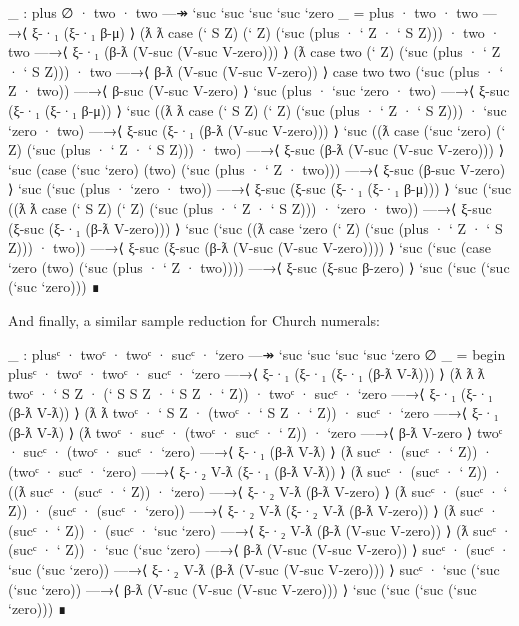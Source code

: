 \begin{fence}
\begin{code}
_ : plus {∅} · two · two —↠ `suc `suc `suc `suc `zero
_ =
    plus · two · two
  —→⟨ ξ-·₁ (ξ-·₁ β-μ) ⟩
    (ƛ ƛ case (` S Z) (` Z) (`suc (plus · ` Z · ` S Z))) · two · two
  —→⟨ ξ-·₁ (β-ƛ (V-suc (V-suc V-zero))) ⟩
    (ƛ case two (` Z) (`suc (plus · ` Z · ` S Z))) · two
  —→⟨ β-ƛ (V-suc (V-suc V-zero)) ⟩
    case two two (`suc (plus · ` Z · two))
  —→⟨ β-suc (V-suc V-zero) ⟩
    `suc (plus · `suc `zero · two)
  —→⟨ ξ-suc (ξ-·₁ (ξ-·₁ β-μ)) ⟩
    `suc ((ƛ ƛ case (` S Z) (` Z) (`suc (plus · ` Z · ` S Z)))
      · `suc `zero · two)
  —→⟨ ξ-suc (ξ-·₁ (β-ƛ (V-suc V-zero))) ⟩
    `suc ((ƛ case (`suc `zero) (` Z) (`suc (plus · ` Z · ` S Z))) · two)
  —→⟨ ξ-suc (β-ƛ (V-suc (V-suc V-zero))) ⟩
    `suc (case (`suc `zero) (two) (`suc (plus · ` Z · two)))
  —→⟨ ξ-suc (β-suc V-zero) ⟩
    `suc (`suc (plus · `zero · two))
  —→⟨ ξ-suc (ξ-suc (ξ-·₁ (ξ-·₁ β-μ))) ⟩
    `suc (`suc ((ƛ ƛ case (` S Z) (` Z) (`suc (plus · ` Z · ` S Z)))
      · `zero · two))
  —→⟨ ξ-suc (ξ-suc (ξ-·₁ (β-ƛ V-zero))) ⟩
    `suc (`suc ((ƛ case `zero (` Z) (`suc (plus · ` Z · ` S Z))) · two))
  —→⟨ ξ-suc (ξ-suc (β-ƛ (V-suc (V-suc V-zero)))) ⟩
    `suc (`suc (case `zero (two) (`suc (plus · ` Z · two))))
  —→⟨ ξ-suc (ξ-suc β-zero) ⟩
   `suc (`suc (`suc (`suc `zero)))
  ∎
\end{code}
\end{fence}

And finally, a similar sample reduction for Church numerals:

\begin{fence}
\begin{code}
_ : plusᶜ · twoᶜ · twoᶜ · sucᶜ · `zero —↠ `suc `suc `suc `suc `zero {∅}
_ =
  begin
    plusᶜ · twoᶜ · twoᶜ · sucᶜ · `zero
  —→⟨ ξ-·₁ (ξ-·₁ (ξ-·₁ (β-ƛ V-ƛ))) ⟩
    (ƛ ƛ ƛ twoᶜ · ` S Z · (` S S Z · ` S Z · ` Z)) · twoᶜ · sucᶜ · `zero
  —→⟨ ξ-·₁ (ξ-·₁ (β-ƛ V-ƛ)) ⟩
    (ƛ ƛ twoᶜ · ` S Z · (twoᶜ · ` S Z · ` Z)) · sucᶜ · `zero
  —→⟨ ξ-·₁ (β-ƛ V-ƛ) ⟩
    (ƛ twoᶜ · sucᶜ · (twoᶜ · sucᶜ · ` Z)) · `zero
  —→⟨ β-ƛ V-zero ⟩
    twoᶜ · sucᶜ · (twoᶜ · sucᶜ · `zero)
  —→⟨ ξ-·₁ (β-ƛ V-ƛ) ⟩
    (ƛ sucᶜ · (sucᶜ · ` Z)) · (twoᶜ · sucᶜ · `zero)
  —→⟨ ξ-·₂ V-ƛ (ξ-·₁ (β-ƛ V-ƛ)) ⟩
    (ƛ sucᶜ · (sucᶜ · ` Z)) · ((ƛ sucᶜ · (sucᶜ · ` Z)) · `zero)
  —→⟨ ξ-·₂ V-ƛ (β-ƛ V-zero) ⟩
    (ƛ sucᶜ · (sucᶜ · ` Z)) · (sucᶜ · (sucᶜ · `zero))
  —→⟨ ξ-·₂ V-ƛ (ξ-·₂ V-ƛ (β-ƛ V-zero)) ⟩
    (ƛ sucᶜ · (sucᶜ · ` Z)) · (sucᶜ · `suc `zero)
  —→⟨ ξ-·₂ V-ƛ (β-ƛ (V-suc V-zero)) ⟩
    (ƛ sucᶜ · (sucᶜ · ` Z)) · `suc (`suc `zero)
  —→⟨ β-ƛ (V-suc (V-suc V-zero)) ⟩
    sucᶜ · (sucᶜ · `suc (`suc `zero))
  —→⟨ ξ-·₂ V-ƛ (β-ƛ (V-suc (V-suc V-zero))) ⟩
    sucᶜ · `suc (`suc (`suc `zero))
  —→⟨ β-ƛ (V-suc (V-suc (V-suc V-zero))) ⟩
    `suc (`suc (`suc (`suc `zero)))
  ∎
\end{code}
\end{fence}


